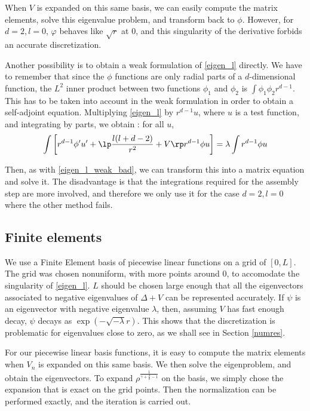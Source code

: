 \documentclass[10pt,a4paper,reqno]{amsart}
\begin{document}
When $V$ is expanded on this same basis, we can easily compute the
matrix elements, solve this eigenvalue problem, and transform back to
$\phi$. However, for $d = 2, l = 0$, $\varphi$ behaves like $\sqrt r$
at $0$, and this singularity of the derivative forbids an accurate
discretization.

Another possibility is to obtain a weak formulation of \eqref{eigen_l}
directly. We have to remember that since the $\phi$ functions are only
radial parts of a $d$-dimensional function, the $L^{2}$ inner product
between two functions $\phi_{1}$ and $\phi_{2}$ is $\int \phi_{1}
\phi_{2} r^{d-1}$. This has to be taken into account in the weak
formulation in order to obtain a self-adjoint equation. Multiplying
\eqref{eigen_l} by $r^{d-1} u$, where $u$ is a test function, and
integrating by parts, we obtain : for all $u$,
\begin{align}
  \label{eigen_l_weak}
  \int\left[ r^{d-1} \phi' u' + \lp\frac{l(l+d-2)}{r^{2}} + V\rp r^{d-1}\phi u\right] = \lambda \int r^{d-1}\phi u
\end{align}

Then, as with \eqref{eigen_l_weak_bad}, we can transform this into a
matrix equation and solve it. The disadvantage is that the
integrations required for the assembly step are more involved, and
therefore we only use it for the case $d = 2, l = 0$ where the other
method fails.

\subsection{Finite elements}
We use a Finite Element basis of piecewise linear functions on a grid
of $[0,L]$. The grid was chosen nonuniform, with more points around
$0$, to accomodate the singularity of \eqref{eigen_l}. $L$ should be
chosen large enough that all the eigenvectors associated to negative
eigenvalues of $\Delta + V$ can be represented accurately. If $\psi$
is an eigenvector with negative eigenvalue $\lambda$, then, assuming
$V$ has fast enough decay, $\psi$ decays as $\exp(-\sqrt{-\lambda}
r)$. This shows that the discretization is problematic for eigenvalues
close to zero, as we shall see in Section \ref{numres}.

For our piecewise linear basis functions, it is easy to compute the
matrix elements when $V_{n}$ is expanded on this same basis. We then
solve the eigenproblem, and obtain the eigenvectors. To expand
$\rho^{\frac 1 {\gamma + \frac d 2 - 1}}$ on the basis, we simply
chose the expansion that is exact on the grid points. Then the
normalization can be performed exactly, and the iteration is carried
out.
\end{document}

